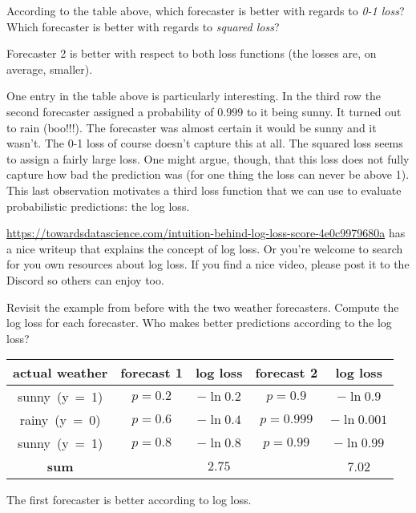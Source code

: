 \documentclass[assignment03_Solutions]{subfiles}
\begin{document}
\vspace{1em}

\begin{understandingcheck}
According to the table above, which forecaster is better with regards to \emph{0-1 loss}?  Which forecaster is better with regards to \emph{squared loss}?

\begin{boxedsolution}
Forecaster 2 is better with respect to both loss functions (the losses are, on average, smaller).
\end{boxedsolution}
\end{understandingcheck}

One entry in the table above is particularly interesting.  In the third row the second forecaster assigned a probability of $0.999$ to it being sunny.  It turned out to rain (boo!!!).  The forecaster was almost certain it would be sunny and it wasn't.  The 0-1 loss of course doesn't capture this at all.  The squared loss seems to assign a fairly large loss.  One might argue, though, that this loss does not fully capture how bad the prediction was (for one thing the loss can never be above 1).  This last observation motivates a third loss function that we can use to evaluate probabilistic predictions: the log loss.
\vspace{1em}
\begin{externalresources}[(30 minutes)]
\url{https://towardsdatascience.com/intuition-behind-log-loss-score-4e0c9979680a} has a nice writeup that explains the concept of log loss.  Or you're welcome to search for you own resources about log loss. If you find a nice video, please post it to the Discord so others can enjoy too.
\begin{exercise}
Revisit the example from before with the two weather forecasters.  Compute the log loss for each forecaster.  Who makes better predictions according to the log loss?
\begin{boxedsolution}
\begin{center}
\small
\begin{tabular}{c | c | c | c | c }
\hline
actual weather & forecast 1 & log loss & forecast 2 & log loss \\
\hline
\mbox{sunny (y = 1)} & $p = 0.2$ & $-\ln 0.2$ & $p = 0.9$ &  $-\ln 0.9$\\
\mbox{rainy (y = 0)} & $p = 0.6$  &  $-\ln 0.4$ & $p = 0.999$ &  $-\ln 0.001$\\ 
\mbox{sunny (y = 1)} & $p = 0.8$ & $-\ln 0.8$ & $p = 0.99$ & $-\ln 0.99$\\
\hline
\textbf{sum} & & $2.75$ &  & 7.02
\end{tabular}
\end{center}
The first forecaster is better according to log loss.

\end{boxedsolution}

\end{exercise}
\end{externalresources}
\end{document}
